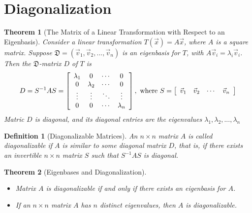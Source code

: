 \documentclass[10pt]{report}
\newtheorem{thm2}{Theorem}[section]
\newtheorem{def2}{Definition}[section]
\begin{document}
\section{Diagonalization}
\begin{thm2}[The Matrix of a Linear Transformation with Respect to an Eigenbasis]
Consider a linear transformation $T(\vec{x}) = A\vec{x}$, where $A$ is a square matrix. Suppose $\mathfrak{D}=(\vec{v}_1, \vec{v}_2,..., \vec{v}_n)$ is an eigenbasis for $T$, with $A\vec{v}_i=\lambda_i\vec{v}_i$. Then the $\mathfrak{D}$-matrix $D$ of $T$ is
$$D=S^{-1}AS = \left[\begin{array}{c c c c}
\lambda_1 & 0 & \cdots & 0\\
0 & \lambda_2 & \cdots & 0\\
\vdots & \vdots & \ddots & \vdots\\
0 & 0 & \cdots & \lambda_n
\end{array}\right], \text{  where  } S = \left[ \begin{array}{c c c c}
\vec{v}_1 & \vec{v}_2 & \cdots & \vec{v}_n
\end{array}\right]$$
Matric $D$ is diagonal, and its diagonal entries are the eigenvalues $\lambda_1, \lambda_2,..., \lambda_n$
\end{thm2}
\begin{def2}[Diagonalizable Matrices]
An $n\times n$ matrix $A$ is called diagonalizable if $A$ is similar to some diagonal matrix $D$, that is, if there exists an invertible $n\times n$ matrix $S$ such that $S^{-1}AS$ is diagonal.
\end{def2}
\begin{thm2}[Eigenbases and Diagonalization]
\begin{itemize}
\item[a.] Matrix $A$ is diagonalizable if and only if there exists an eigenbasis for $A$.
\item[b.] If an $n\times n$ matrix $A$ has $n$ distinct eigenvalues, then $A$ is diagonalizable.
\end{itemize}
\end{thm2}
\end{document}
